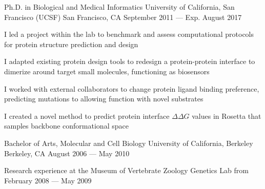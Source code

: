 

\begin{cventries}

  \cventry
  {Ph.D. in Biological and Medical Informatics} %
  {University of California, San Francisco (UCSF)} %
  {San Francisco, CA} %
  {September 2011 --- Exp. August 2017} %
  {
    \begin{cvitems} %
    \item I led a project within the lab to benchmark and assess computational protocols for protein structure prediction and design
    \item I adapted existing protein design tools to redesign a
      protein-protein interface to dimerize around target small molecules, functioning
      as biosensors
    \item I worked with external collaborators to change protein ligand binding preference, predicting mutations to allowing function with novel substrates
    \item I created a novel method to predict protein interface $\Delta\Delta G$ values in Rosetta that samples backbone conformational space
    \end{cvitems}
  }

  \cventry
  {Bachelor of Arts, Molecular and Cell Biology} %
  {University of California, Berkeley} %
  {Berkeley, CA} %
  {August 2006 --- May 2010} %
  {
    \begin{cvitems} %
    \item Research experience at the Museum of Vertebrate Zoology Genetics Lab from February 2008 --- May 2009
    \end{cvitems}
  }

\end{cventries}
